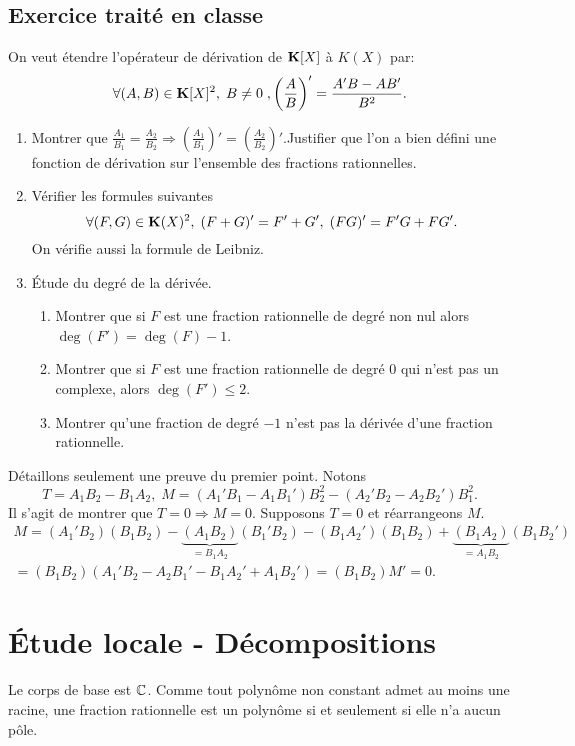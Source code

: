 \subsection{Exercice traité en classe}
On veut étendre l'opérateur de dérivation de $\mathbf{K}[X]$ à $K(X)$ par: 
\[
\forall (A,B)\in \mathbf{K}[X]^2,\; B\neq 0\;, \left( \frac{A}{B}\right)' = \frac{A' B - AB'}{B^2}. 
\]
\begin{enumerate}
 \item Montrer que $\frac{A_1}{B_1} = \frac{A_2}{B_2} \Rightarrow \left( \frac{A_1}{B_1}\right)'  = \left( \frac{A_2}{B_2}\right)'$.\newline Justifier que l'on a bien défini une fonction de dérivation sur l'ensemble des fractions rationnelles.
 \item Vérifier les formules suivantes
\[
 \forall (F,G) \in \mathbf{K}(X)^2, \; (F+G)' = F' + G', \; (FG)' = F'G + FG'.
\]
On vérifie aussi la formule de Leibniz.
 \item \'Etude du degré de la dérivée.
\begin{enumerate}
 \item Montrer que si $F$ est une fraction rationnelle de degré non nul alors $\deg(F')=\deg(F)-1$. 
 \item Montrer que si $F$ est une fraction rationnelle de degré $0$ qui n'est pas un complexe, alors $\deg(F')\leq2$.
 \item Montrer qu'une fraction de degré $-1$ n'est pas la dérivée d'une fraction rationnelle.
\end{enumerate}
\end{enumerate}
Détaillons seulement une preuve du premier point. Notons
\[
  T = A_1B_2 - B_1A_2, \; M =(A_1'B_1-A_1B_1')B_2^2 - (A_2'B_2-A_2B_2')B_1^2.
\]
Il s'agit de montrer que $T= 0 \Rightarrow M = 0$. Supposons $T=0$ et réarrangeons $M$.
\begin{multline*}
  M = (A_1'B_2)(B_1B_2) -\underset{=B_1A_2}{\underbrace{(A_1B_2)}}(B_1'B_2) - (B_1A_2')(B_1B_2) + \underset{=A_1B_2}{\underbrace{(B_1A_2)}}(B_1B_2')\\
  = (B_1B_2)\left(A_1'B_2 - A_2B_1' - B_1A_2' + A_1B_2' \right)
  = (B_1B_2)M' = 0.
\end{multline*}


\section{\'Etude locale - Décompositions}
Le corps de base est $\mathbb{C}$. Comme tout polynôme non constant admet au moins une racine, une fraction rationnelle est un polynôme si et seulement si elle n'a aucun pôle.

